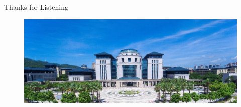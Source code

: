 \documentclass[
	9pt, %
]{beamer}
\begin{document}
%	


\begin{frame}[plain] %
	\begin{center}
		{\Huge Thanks for Listening}

		
	\end{center}
				\begin{figure}
				\includegraphics[width=1.0\linewidth]{end.jpg}			
			\end{figure}
		
\end{frame}
\end{document}
